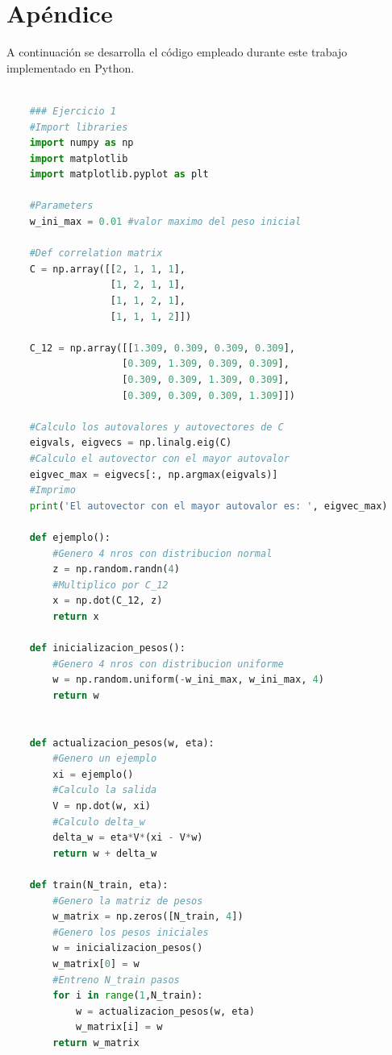 \documentclass[aps,prb,twocolumn,superscriptaddress,floatfix,longbibliography]{revtex4-2}
\begin{document}
\begin{figure}
     \label{fig:ej2_fig1}
\end{figure}


\newpage

\section*{Apéndice}
A continuación se desarrolla el código empleado durante este trabajo implementado en Python.




\begin{lstlisting}[language=Python]
    
    ### Ejercicio 1
    #Import libraries
    import numpy as np
    import matplotlib
    import matplotlib.pyplot as plt
    
    #Parameters
    w_ini_max = 0.01 #valor maximo del peso inicial

    #Def correlation matrix
    C = np.array([[2, 1, 1, 1],
                  [1, 2, 1, 1],
                  [1, 1, 2, 1],
                  [1, 1, 1, 2]])
    
    C_12 = np.array([[1.309, 0.309, 0.309, 0.309],
                    [0.309, 1.309, 0.309, 0.309],
                    [0.309, 0.309, 1.309, 0.309],
                    [0.309, 0.309, 0.309, 1.309]])
    
    #Calculo los autovalores y autovectores de C
    eigvals, eigvecs = np.linalg.eig(C)
    #Calculo el autovector con el mayor autovalor
    eigvec_max = eigvecs[:, np.argmax(eigvals)]
    #Imprimo
    print('El autovector con el mayor autovalor es: ', eigvec_max)
    
    def ejemplo():
        #Genero 4 nros con distribucion normal
        z = np.random.randn(4)
        #Multiplico por C_12
        x = np.dot(C_12, z)
        return x
    
    def inicializacion_pesos():
        #Genero 4 nros con distribucion uniforme
        w = np.random.uniform(-w_ini_max, w_ini_max, 4)
        return w
        
    
    def actualizacion_pesos(w, eta):
        #Genero un ejemplo
        xi = ejemplo()
        #Calculo la salida
        V = np.dot(w, xi)
        #Calculo delta_w
        delta_w = eta*V*(xi - V*w)
        return w + delta_w
    
    def train(N_train, eta):
        #Genero la matriz de pesos
        w_matrix = np.zeros([N_train, 4])
        #Genero los pesos iniciales
        w = inicializacion_pesos()
        w_matrix[0] = w
        #Entreno N_train pasos
        for i in range(1,N_train):
            w = actualizacion_pesos(w, eta)
            w_matrix[i] = w
        return w_matrix
    

\end{lstlisting}
\end{document}
